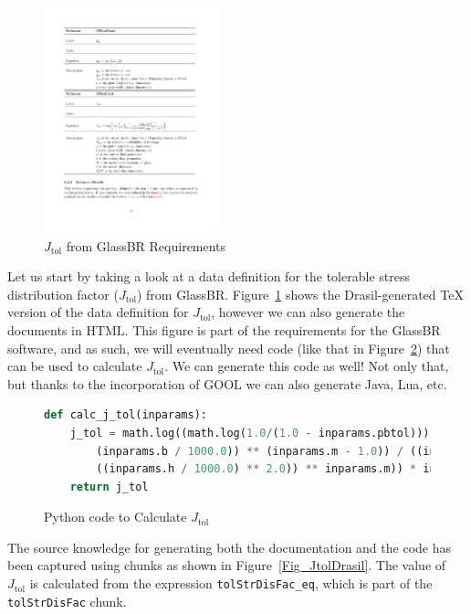 \documentclass[sigconf]{acmart}
\newcommand{\jtol}{$J_{\mbox{tol}}$}
\newcommand{\inlHask}[1]{\lstinline[language=Haskell, frame=single, showstringspaces=false]{#1}}
\begin{document}
\begin{figure}
\begin{center}
\includegraphics[width=0.45\textwidth]{./figures/Jtol_pdf.pdf}
\end{center}
\caption{\jtol{} from GlassBR Requirements}
\label{Fig_Jtolpdf}
\end{figure}

Let us start by taking a look at a data definition for the tolerable stress 
distribution factor (\jtol{}) from GlassBR. Figure~\ref{Fig_Jtolpdf} 
shows the Drasil-generated TeX version of the data definition for 
\jtol{}, however we can also generate the documents in HTML. This 
figure is part of the requirements for the GlassBR software, and as such, we 
will eventually need code (like that in Figure~\ref{Fig_JtolPython}) that can be
used to calculate \jtol{}. We can generate this code as well! Not only 
that, but thanks to the incorporation of GOOL we can also generate Java, Lua, 
etc. 

\begin{figure}
\begin{lstlisting}[language=python, frame=single, showstringspaces=false, 
basicstyle=\small]
def calc_j_tol(inparams):
    j_tol = math.log((math.log(1.0/(1.0 - inparams.pbtol))) * ((((inparams.a / 1000.0) * 
        (inparams.b / 1000.0)) ** (inparams.m - 1.0)) / ((inparams.k * (((inparams.E * 1000.0) * 
        ((inparams.h / 1000.0) ** 2.0)) ** inparams.m)) * inparams.ldf))) 
    return j_tol
\end{lstlisting}
\caption{Python code to Calculate \jtol{}}
\label{Fig_JtolPython}
\end{figure}

The source knowledge for generating both the documentation and the code has been
captured using chunks as shown in Figure~\ref{Fig_JtolDrasil}. The value of 
\jtol{} is calculated from the expression {\inlHask{tolStrDisFac_eq}}, which is 
part of the {\inlHask{tolStrDisFac}} chunk.
\end{document}
